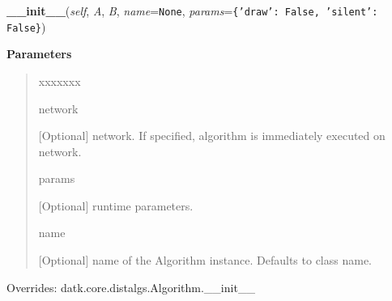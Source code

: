\hspace{.8\funcindent}\begin{boxedminipage}{\funcwidth}

    \raggedright \textbf{\_\_init\_\_}(\textit{self}, \textit{A}, \textit{B}, \textit{name}={\tt None}, \textit{params}={\tt \texttt{\{}\texttt{'}\texttt{draw}\texttt{'}\texttt{: }False\texttt{, }\texttt{'}\texttt{silent}\texttt{'}\texttt{: }False\texttt{\}}})

\setlength{\parskip}{2ex}
\setlength{\parskip}{1ex}
      \textbf{Parameters}
      \vspace{-1ex}

      \begin{quote}
        \begin{Ventry}{xxxxxxx}

          \item[network]

          [Optional] network. If specified, algorithm is immediately 
          executed on network.

          \item[params]

          [Optional] runtime parameters.

          \item[name]

          [Optional] name of the Algorithm instance. Defaults to class 
          name.

        \end{Ventry}

      \end{quote}

      Overrides: datk.core.distalgs.Algorithm.\_\_init\_\_

    \end{boxedminipage}

    \vspace{0.5ex}


